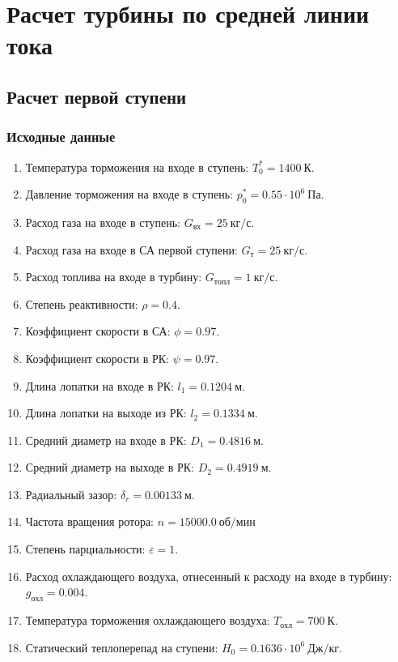 \documentclass[a4paper,10pt]{article}
\begin{document}
    \section{Расчет турбины по средней линии тока}

    

    \subsection{Расчет первой ступени}

    \subsubsection{Исходные данные}

    
    \begin{enumerate}

        \item Температура торможения на входе в ступень: $T_0^* = 1400\ К $.
        \item Давление торможения на входе в ступень: $p_0^* = 0.55 \cdot 10^6 \ Па$.
        \item Расход газа на входе в ступень: $G_{вх} = 25\ кг/с$.
        \item Расход газа на входе в СА первой ступени: $ G_т = 25\ кг/с $.
        \item Расход топлива на входе в турбину: $ G_{топл} = 1\ кг/с $.
        \item Степень реактивности: $ \rho = 0.4 $.
        \item Коэффициент скорости в СА: $ \phi = 0.97 $.
        \item Коэффициент скорости в РК: $ \psi = 0.97 $.
        \item Длина лопатки на входе в РК: $ l_1 = 0.1204\ м $.
        \item Длина лопатки на выходе из РК: $ l_2 = 0.1334\ м $.
        \item Средний диаметр на входе в РК: $ D_1 = 0.4816\ м $.
        \item Средний диаметр на выходе в РК: $ D_2 = 0.4919\ м $.
        \item Радиальный зазор: $ \delta_r = 0.00133\ м $.
        \item Частота вращения ротора: $ n = 15000.0\ об/мин $
        \item Степень парциальности: $ \varepsilon = 1 $.
        \item Расход охлаждающего воздуха, отнесенный к расходу на входе в турбину: $ g_{охл} = 0.004 $.
        \item Температура торможения охлаждающего воздуха: $ T_{охл} = 700\ К $.

        
        \item Статический теплоперепад на ступени: $ H_0 = 0.1636 \cdot 10^6 \ Дж/кг $.

        

    \end{enumerate}
    
\end{document}
